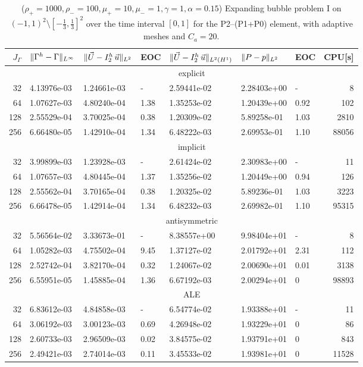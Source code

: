 \begin{table}
\center
\hspace*{-3.25cm}
\begin{tabular}{rllllllr}
\hline
$J_\Gamma$ & $\|\Gamma^h - \Gamma\|_{L^\infty}$ & $\|\vec U - I^h_{2}\,\vec u\|_{L^2}$ & EOC & $\|\vec U - I^h_{2}\,\vec u\|_{L^2(H^1)}$ & $\|P - p\|_{L^2}$ & EOC
& CPU[s] \\
\hline
& \multicolumn{7}{c}{explicit} \\
\hline
 32 & 4.13976e-03 & 1.24661e-03 &    - & 2.59441e-02 & 2.28403e+00 &    - &
8 \\
 64 & 1.07627e-03 & 4.80240e-04 & 1.38 & 1.35253e-02 & 1.20439e+00 & 0.92 &
102 \\
128 & 2.55529e-04 & 3.70025e-04 & 0.38 & 1.20309e-02 & 5.89258e-01 & 1.03 &
2810 \\
256 & 6.66480e-05 & 1.42910e-04 & 1.34 & 6.48222e-03 & 2.69953e-01 & 1.10 &
88056 \\
\hline
& \multicolumn{7}{c}{implicit} \\
\hline
 32 & 3.99899e-03 & 1.23928e-03 &    - & 2.61424e-02 & 2.30983e+00 &    - &
11 \\
 64 & 1.07657e-03 & 4.80445e-04 & 1.37 & 1.35256e-02 & 1.20449e+00 & 0.94 &
126 \\
128 & 2.55562e-04 & 3.70165e-04 & 0.38 & 1.20325e-02 & 5.89236e-01 & 1.03 &
3223 \\
256 & 6.66478e-05 & 1.42914e-04 & 1.34 & 6.48232e-03 & 2.69982e-01 & 1.10 &
95315 \\
\hline
& \multicolumn{7}{c}{antisymmetric} \\
\hline
 32 & 5.56564e-02 & 3.33673e-01 &    - & 8.38557e+00 & 9.98404e+01 &    - &
8 \\
 64 & 1.05282e-03 & 4.75502e-04 & 9.45 & 1.37127e-02 & 2.01792e+01 & 2.31 &
112 \\
128 & 2.52742e-04 & 3.82170e-04 & 0.32 & 1.24067e-02 & 2.00690e+01 & 0.01 &
3138 \\
256 & 6.55951e-05 & 1.45885e-04 & 1.36 & 6.67192e-03 & 2.00294e+01 &    0 &
98893 \\
\hline
& \multicolumn{7}{c}{ALE} \\
\hline
 32 & 6.83612e-03 & 4.84858e-03 &    - & 6.54774e-02 & 1.93388e+01 & - &    11
\\
 64 & 3.06192e-03 & 3.00123e-03 & 0.69 & 4.26948e-02 & 1.93229e+01 & 0 &    86
\\
128 & 2.60733e-03 & 2.96509e-03 & 0.02 & 3.84575e-02 & 1.93791e+01 & 0 &   843
\\
256 & 2.49421e-03 & 2.74014e-03 & 0.11 & 3.45533e-02 & 1.93981e+01 & 0 & 11528
\\
\hline
\end{tabular}
\hspace*{-3.25cm}
\caption[Navier--Stokes expanding bubble III errors P2--(P1+P0)]
{($\rho_+ = 1000,\rho_- = 100,\mu_+ = 10,\mu_- =1,\gamma = 1,\alpha=0.15$)
Expanding bubble problem I on $(-1,1)^2\setminus[-\frac{1}{3},\frac{1}{3}]^2$
over the time interval $[0,1]$ for the P2--(P1+P0) element, with adaptive
meshes and $C_a=20$\textdegree.}
\label{tab:nsexpandingbubbleIIIp2pip0}
\end{table}

